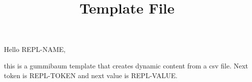\documentclass[a4paper]{scrartcl}
\title{Template File}
\begin{document}
\maketitle

Hello REPL-NAME,

this is a gummibaum template that creates dynamic content from a csv file.
Next token is REPL-TOKEN and next value is REPL-VALUE.\\
\end{document}
